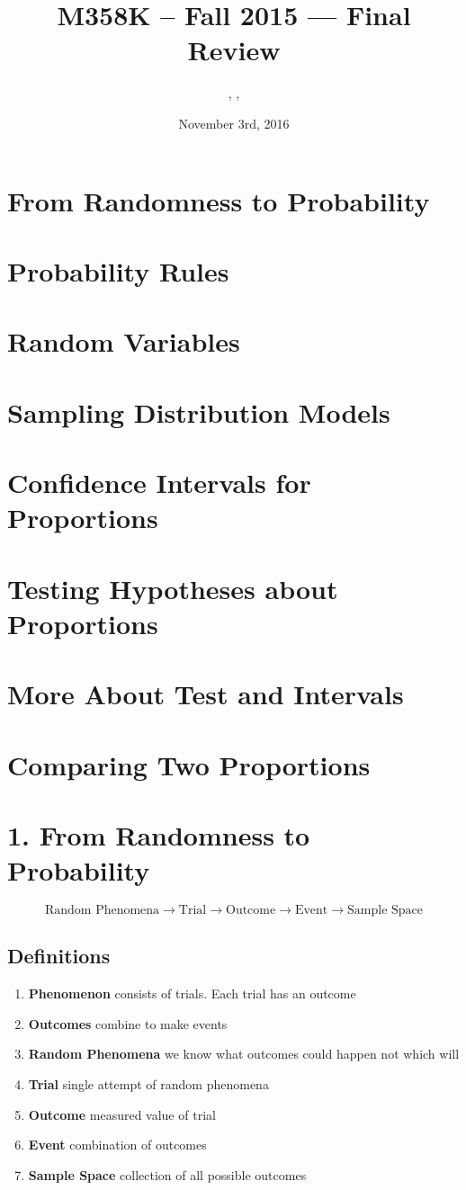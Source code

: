 \documentclass[12pt,a4paper]{article}
\title{M358K -- Fall 2015 --- Final Review \Review}
\author{\Name, \EID, \texttt{\Login}}
\date{November 3rd, 2016
}
\begin{document}
\maketitle
\section*{From Randomness to Probability}
\section*{Probability Rules}
\section*{Random Variables}
\section*{Sampling Distribution Models}
\section*{Confidence Intervals for Proportions}
\section*{Testing Hypotheses about Proportions}
\section*{More About Test and Intervals}
\section*{Comparing Two Proportions}

\newpage
\section*{1. From Randomness to Probability}
{\Large{$$\text{Random Phenomena} \rightarrow \text{Trial} \rightarrow \text{Outcome} \rightarrow \text{Event} \rightarrow \text{Sample Space}$$}}
 \renewcommand{\labelenumii}{\Roman{enumii}}
   \subsection*{Definitions}
   \begin{enumerate}
     \item \textbf{Phenomenon} consists of trials. Each trial has an outcome
     \item \textbf{Outcomes} combine to make events
     \item \textbf{Random Phenomena} we know what outcomes could happen not which will
     \item \textbf{Trial} single attempt of random phenomena
     \item \textbf{Outcome} measured value of trial
     \item \textbf{Event} combination of outcomes
     \item \textbf{Sample Space} collection of all possible outcomes
   \end{enumerate}
   
\end{document}
